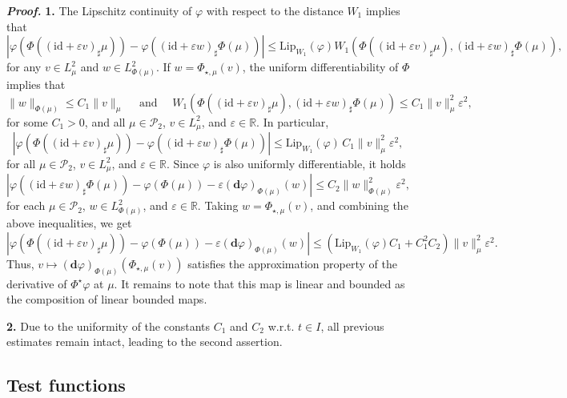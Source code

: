 \documentclass[sn-mathphys-num]{sn-jnl}
\numberwithin{equation}{section}
\theoremstyle{mythm}
\theoremstyle{mydef}
\renewenvironment{proof}{\smallskip\noindent\emph{\textbf{Proof.}}%
  \hspace{1pt}}{\hspace{-5pt}{\nobreak\quad\nobreak\hfill\nobreak%
    $\square$\vspace{2pt}\par}\smallskip\goodbreak}
\newcommand{\Lip}{\mathrm{Lip}}
\renewcommand{\phi}{\varphi}
\newcommand{\id}{\mathrm{id}}
\renewcommand{\mathbf}[1]{\bm{#1}}
\begin{document}
\begin{proof}
  \textbf{1.} The Lipschitz continuity of \( \phi \) with respect to the distance \( W_1 \) implies that
   \[
     \left|\phi\left(\Phi((\id + \varepsilon v)_\sharp\mu)\right)-\phi\left((\id + \varepsilon w)_\sharp \Phi(\mu)\right)\right|\le
     \Lip_{W_1}(\phi) W_1 \left(\Phi((\id + \varepsilon v)_\sharp\mu),(\id + \varepsilon w)_\sharp \Phi(\mu)\right),
   \]
   for any \( v\in {L}^2_{\mu} \) and \( w\in L_{\Phi(\mu)}^2 \).
   If \( w = \Phi_{\star,\mu}(v) \), the uniform differentiability of \( \Phi \) implies that
   \[
     \|w\|_{\Phi(\mu)}\le C_1\|v\|_{\mu}\quad \text{ and }\quad
    W_1 \left(\Phi((\id + \varepsilon v)_\sharp\mu),(\id + \varepsilon w)_\sharp \Phi(\mu)\right)\le C_1\|v\|^2_{\mu}\varepsilon^2,
  \]
  for some \( C_1>0 \), and all \( \mu\in \mathcal{P}_2\),  \(v\in {L}^2_{\mu}\), and \(\varepsilon\in \mathbb{R}\).
   In particular,
  \[
    \left|\phi\left(\Phi((\id + \varepsilon v)_\sharp\mu)\right)-\phi\left((\id + \varepsilon w)_\sharp \Phi(\mu)\right)\right|\le \Lip_{W_1}(\phi) \, C_1 \|v\|^2_{\mu}\varepsilon^{2},
  \]
  for all \( \mu\in \mathcal{P}_2\),  \(v\in {L}^2_{\mu}\), and \(\varepsilon\in \mathbb{R}\). Since \( \phi \) is also uniformly differentiable, it holds
  \[
    \left| \phi\left((\id + \varepsilon w)_\sharp \Phi(\mu)\right) - \phi(\Phi(\mu)) - \varepsilon (\mathbf{d}\phi)_{\Phi(\mu)}(w)\right| \le C_2\|w\|^2_{\Phi(\mu)}\varepsilon^{2},
  \]
  for each \( \mu\in \mathcal{P}_2\),  \(w\in L^2_{\Phi(\mu)}\), and \(\varepsilon\in \mathbb{R}\).
  Taking \( w = \Phi_{\star,\mu}(v) \), and combining the above inequalities, we get
  \[
    \left| \phi\left(\Phi((\id + \varepsilon v)_\sharp\mu)\right) - \phi(\Phi(\mu)) - \varepsilon (\mathbf{d}\phi)_{\Phi(\mu)}(w)\right| \le \left(\Lip_{W_1}(\phi )C_1 + C_1^2C_2\right)\|v\|^2_{\mu}\varepsilon^{2}.
\]
Thus, \( v \mapsto (\mathbf{d}\phi )_{\Phi(\mu)}(\Phi_{\star,\mu}(v))\) satisfies the approximation property of the derivative of \( \Phi^{\star}\phi \) at \( \mu \).
  It remains to note that this map is linear and bounded as the composition of linear bounded maps.

  \textbf{2.} Due to the uniformity of the constants $C_1$ and $C_2$ w.r.t. $t \in I$, all previous estimates remain intact, leading to the second assertion.  
\end{proof}



\subsection{Test functions}
\end{document}
